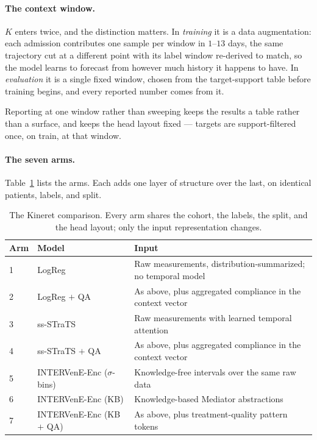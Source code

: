 \paragraph{The context window.}
$K$ enters twice, and the distinction matters. In \emph{training} it is a data augmentation: each admission contributes one sample per window in $1$--$13$ days, the same trajectory cut at a different point with its label window re-derived to match, so the model learns to forecast from however much history it happens to have. In \emph{evaluation} it is a single fixed window, chosen from the target-support table before training begins, and every reported number comes from it.

Reporting at one window rather than sweeping keeps the results a table rather than a surface, and keeps the head layout fixed --- targets are support-filtered once, on train, at that window.

\paragraph{The seven arms.}
Table~\ref{tab:kineret-ladder} lists the arms. Each adds one layer of structure over the last, on identical patients, labels, and split.

\begin{table}[htbp]
\centering
\singlespacing
\caption{The Kineret comparison. Every arm shares the cohort, the labels, the split, and the head layout; only the input representation changes.}
\label{tab:kineret-ladder}
\small
\begin{tabularx}{\textwidth}{l>{\raggedright\arraybackslash}p{}>{\raggedright\arraybackslash}X}
\toprule
Arm & Model & Input \\
\midrule
1 & LogReg                     & Raw measurements, distribution-summarized; no temporal model \\
2 & LogReg $+$ QA              & As above, plus aggregated compliance in the context vector \\
3 & ss-STraTS                  & Raw measurements with learned temporal attention \\
4 & ss-STraTS $+$ QA           & As above, plus aggregated compliance in the context vector \\
5 & INTERVenE-Enc ($\sigma$-bins) & Knowledge-free intervals over the same raw data \\
6 & INTERVenE-Enc (KB)         & Knowledge-based Mediator abstractions \\
7 & INTERVenE-Enc (KB $+$ QA)  & As above, plus treatment-quality pattern tokens \\
\bottomrule
\end{tabularx}
\end{table}

